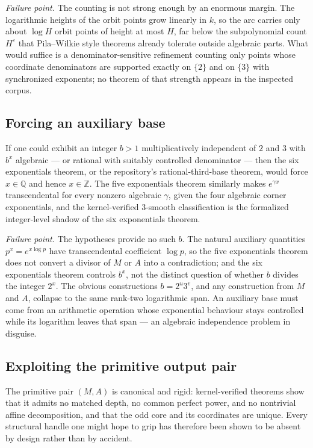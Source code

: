 \documentclass[11pt,oneside]{article}
\theoremstyle{definition}
\theoremstyle{remark}
\newcommand{\Z}{\mathbb Z}
\newcommand{\Q}{\mathbb Q}
\begin{document}
\emph{Failure point.}  The counting is not strong enough by an enormous margin.  The
logarithmic heights of the orbit points grow linearly in $k$, so the arc carries only about
$\log H$ orbit points of height at most $H$, far below the subpolynomial count $H^{\varepsilon}$
that Pila--Wilkie style theorems already tolerate outside algebraic parts.  What would
suffice is a denominator-sensitive refinement counting only points whose coordinate
denominators are supported exactly on $\{2\}$ and on $\{3\}$ with synchronized exponents; no
theorem of that strength appears in the inspected corpus.

\subsection{Forcing an auxiliary base}
\label{at:auxbase}

If one could exhibit an integer $b>1$ multiplicatively independent of $2$ and $3$ with
$b^{x}$ algebraic --- or rational with suitably controlled denominator --- then the six
exponentials theorem, or the repository's rational-third-base theorem, would force
$x\in\Q$ and hence $x\in\Z$.  The five exponentials theorem \cite{Waldschmidt2000,Roy1992}
similarly makes $e^{\gamma x}$ transcendental for every nonzero algebraic $\gamma$, given
the four algebraic corner exponentials, and the kernel-verified $3$-smooth classification is
the formalized integer-level shadow of the six exponentials theorem.

\emph{Failure point.}  The hypotheses provide no such $b$.  The natural auxiliary quantities
$p^{x}=e^{x\log p}$ have transcendental coefficient $\log p$, so the five exponentials
theorem does not convert a divisor of $M$ or $A$ into a contradiction; and the six
exponentials theorem controls $b^{x}$, not the distinct question of whether $b$ divides the
integer $2^{x}$.  The obvious constructions $b=2^{u}3^{v}$, and any construction from $M$ and
$A$, collapse to the same rank-two logarithmic span.  An auxiliary base must come from an
arithmetic operation whose exponential behaviour stays controlled while its logarithm leaves
that span --- an algebraic independence problem in disguise.

\subsection{Exploiting the primitive output pair}
\label{at:primitive}

The primitive pair $(M,A)$ is canonical and rigid: kernel-verified theorems show that it
admits no matched depth, no common perfect power, and no nontrivial affine decomposition,
and that the odd core and its coordinates are unique.  Every structural handle one might
hope to grip has therefore been shown to be absent by design rather than by accident.
\end{document}
